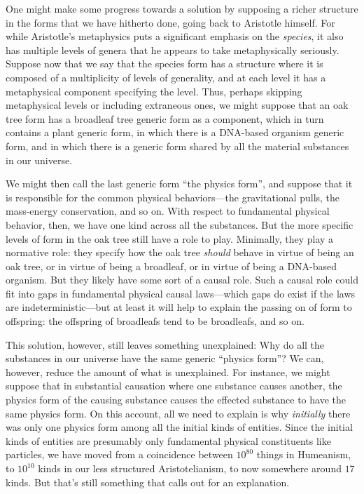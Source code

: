 One might make some progress towards a solution by supposing a richer structure in the forms that we have hitherto
done, going back to Aristotle himself. For while Aristotle's metaphysics puts a significant emphasis on the \textit{species},
it also has multiple levels of genera that he appears to take metaphysically seriously. Suppose now that we say that 
the species form has a structure where it is composed of a multiplicity of levels of generality, and at each level 
it has a metaphysical component specifying the level. Thus, perhaps skipping metaphysical levels or including extraneous 
ones, we might suppose that an oak tree form has a broadleaf tree generic form as a component, which in turn contains 
a plant generic form, in which there is a DNA-based organism generic form, and in which there is a generic form shared 
by all the material substances in our universe. 

We might then call the last generic form ``the physics form'', and suppose that it is responsible for the common 
physical behaviors---the gravitational pulls, the mass-energy conservation, and so on. With respect to fundamental
physical behavior, then, we have one kind across all the substances. But the more specific levels of form in the 
oak tree still have a role to play. Minimally, they play a normative role: they specify how the oak tree \textit{should}
behave in virtue of being an oak tree, or in virtue of being a broadleaf, or in virtue of being a DNA-based organism.
But they likely have some sort of a causal role. Such a causal role could fit into gaps in fundamental physical causal laws---which gaps do exist if the laws are indeterministic---but at least it will help to explain the 
passing on of form to offspring: the offspring of broadleafs tend to be broadleafs, and so on. 

This solution, however, still leaves something unexplained: Why do all the substances in our universe have the 
same generic ``physics form''? We can, however, reduce the amount of what is unexplained. For instance, we might 
suppose that in substantial causation where one substance causes another, the physics form of the causing substance
causes the effected substance to have the same physics form. On this account, all we need to explain is why 
\textit{initially} there was only one physics form among all the initial kinds of entities. Since the initial 
kinds of entities are presumably only fundamental physical constituents like particles, we have moved from a 
coincidence between $10^{80}$ things in Humeanism, to $10^{10}$ kinds in our less structured Aristotelianism,
to now somewhere around $17$ kinds. But that's still something that calls out for an explanation.

